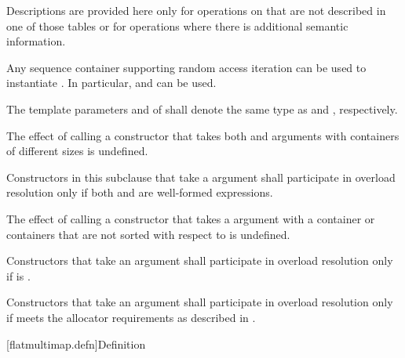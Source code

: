 \begin{codeblock}
\begin{codeblock}
\begin{codeblock}
\begin{addedblock}
\pnum
Descriptions are provided here only for operations on 
that are not described in one of those tables or for operations where
there is additional semantic information.

\pnum
Any sequence container supporting random access iteration can be used to
instantiate . In particular, 
and  can be used.

\pnum
The template parameters  and  of 
shall denote the same type as 
and , respectively.

\pnum
The effect of calling a constructor that takes both 
and  arguments with containers of different sizes is
undefined.

\pnum
Constructors in this subclause that take a 
argument  shall participate in overload resolution only if
both  and  are well-formed
expressions.

\pnum
The effect of calling a constructor that takes a 
argument with a container or containers that are not sorted with respect
to  is undefined.

\pnum
Constructors that take an  argument shall participate in overload
resolution only if  is .

\pnum
Constructors that take an  argument shall participate in overload
resolution only if  meets the allocator requirements as described
in .

[flatmultimap.defn]{Definition}


\end{addedblock}
\end{codeblock}
\end{codeblock}
\end{codeblock}
